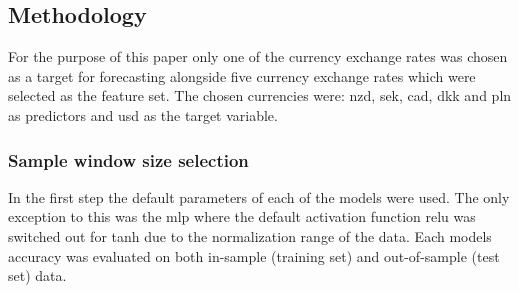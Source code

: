 % 
% 

\subsection{Methodology}\label{Methodology}

For the purpose of this paper only one of the currency exchange rates was chosen as a target for forecasting alongside five currency exchange rates which were selected as the feature set. The chosen currencies were: \gls{nzd}, \gls{sek}, \gls{cad}, \gls{dkk} and \gls{pln} as predictors and \gls{usd} as the target variable.

\subsubsection{Sample window size selection}\label{Sample window size selection}

In the first step the default parameters of each of the models were used. The only exception to this was the \gls{mlp} where the default activation function \gls{relu} was switched out for \gls{tanh} due to the normalization range of the data. Each models accuracy was evaluated on both in-sample (training set) and out-of-sample (test set) data.

